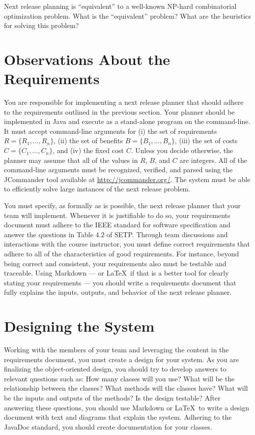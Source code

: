 Next release planning is ``equivalent'' to a well-known NP-hard combinatorial optimization problem.  What is the
``equivalent'' problem? What are the heuristics for solving this problem?

\section*{Observations About the Requirements}

You are responsible for implementing a next release planner that should adhere to the requirements outlined in the
previous section.  Your planner should be implemented in Java and execute as a stand-alone program on the command-line.
It must accept command-line arguments for (i) the set of requirements $R = \{ R_1, \ldots, R_n \}$, (ii) the set of
benefits $B = \{ B_1, \ldots, B_n \}$, (iii) the set of costs $C = \{ C_1, \ldots, C_n \}$, and (iv) the
fixed cost $C$. Unless you decide otherwise, the planner may assume that all of the values in $R$, $B$, and $C$ are
integers. All of the command-line arguments must be recognized, verified, and parsed using the JCommander tool available
at \url{http://jcommander.org/}. The system must be able to efficiently solve large instances of the next release problem.

You must specify, as formally as is possible, the next release planner that your team will implement.  Whenever it is
justifiable to do so, your requirements document must adhere to the IEEE standard for software specification and answer
the questions in Table 4.2 of SETP.  Through team discussions and interactions with the course instructor, you must
define correct requirements that adhere to all of the characteristics of good requirements.  For instance, beyond being
correct and consistent, your requirements also must be testable and traceable.  Using Markdown --- or \LaTeX\ if that is
a better tool for clearly stating your requirements --- you should write a requirements document that fully explains the
inputs, outputs, and behavior of the next release planner.

\section*{Designing the System}

Working with the members of your team and leveraging the content in the requirements document, you must create a design
for your system.  As you are finalizing the object-oriented design, you should try to develop answers to relevant
questions such as: How many classes will you use? What will be the relationship between the classes? What methods will
the classes have? What will be the inputs and outputs of the methods?  Is the design testable?  After answering these
questions, you should use Markdown or \LaTeX\ to write a design document with text and diagrams that explain the system.
Adhering to the JavaDoc standard, you should create documentation for your classes.


